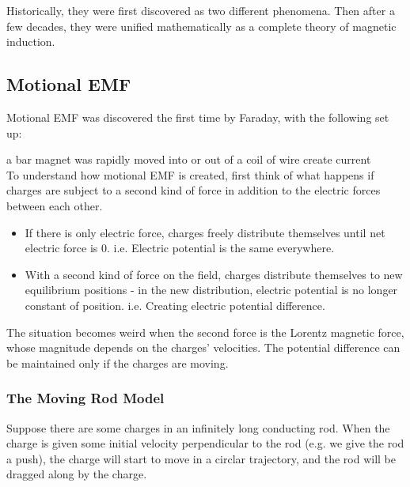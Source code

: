 \documentclass[class=article, crop=false, 12pt]{standalone}
\begin{document}
Historically, they were first discovered as two different phenomena.
Then after a few decades, 
they were unified mathematically as a complete theory of magnetic induction.


\newpage
\subsection{Motional EMF}

Motional EMF was discovered the first time by Faraday, with the following set up:


a bar magnet was rapidly moved into or out of a coil of wire create current\\

To understand how motional EMF is created,
first think of what happens if charges are subject to a second kind of force
in addition to the electric forces between each other.
\begin{itemize}
    \item If there is only electric force,
    charges freely distribute themselves until net electric force is $0$.
    i.e. Electric potential is the same everywhere.

    \item With a second kind of force on the field, 
    charges distribute themselves to new equilibrium positions -  
    in the new distribution, electric potential is no longer constant of position.
    i.e. Creating electric potential difference.
\end{itemize}


The situation becomes weird when the second force is the Lorentz magnetic force,
whose magnitude depends on the charges' velocities.
The potential difference can be maintained only if the charges are moving.



\subsubsection{The Moving Rod Model}

\iffalse
Suppose there are some charges in an infinitely long conducting rod.
When the charge is given some initial velocity perpendicular to the rod
(e.g. we give the rod a push),
the charge will start to move in a circlar trajectory, 
and the rod will be dragged along by the charge. \\
\end{document}
